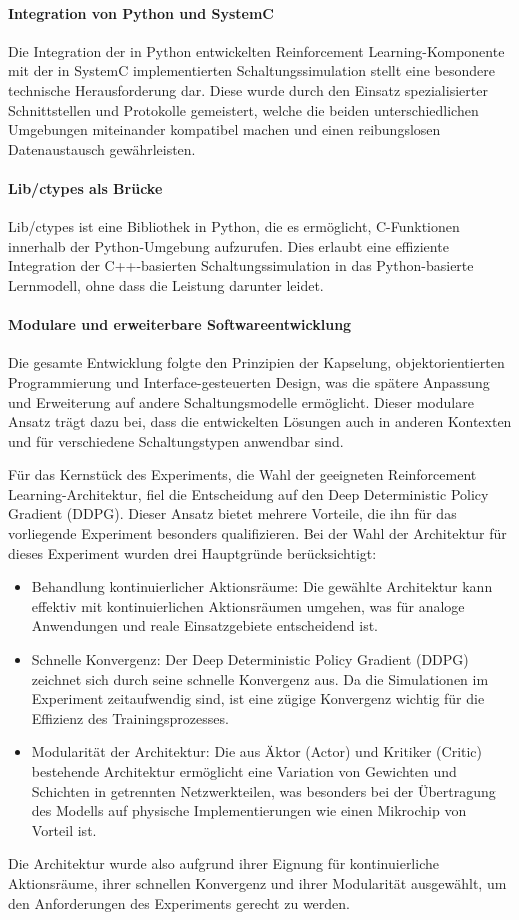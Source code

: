 \paragraph{Integration von Python und SystemC}
Die Integration der in Python entwickelten Reinforcement Learning-Komponente mit der in SystemC implementierten Schaltungssimulation stellt eine besondere technische Herausforderung dar. Diese wurde durch den Einsatz spezialisierter Schnittstellen und Protokolle gemeistert, welche die beiden unterschiedlichen Umgebungen miteinander kompatibel machen und einen reibungslosen Datenaustausch gewährleisten.

\paragraph{Lib/ctypes als Brücke}
Lib/ctypes ist eine Bibliothek in Python, die es ermöglicht, C-Funktionen innerhalb der Python-Umgebung aufzurufen. Dies erlaubt eine effiziente Integration der C++-basierten Schaltungssimulation in das Python-basierte Lernmodell, ohne dass die Leistung darunter leidet.

\paragraph{Modulare und erweiterbare Softwareentwicklung}
Die gesamte Entwicklung folgte den Prinzipien der Kapselung, objektorientierten Programmierung und Interface-gesteuerten Design, was die spätere Anpassung und Erweiterung auf andere Schaltungsmodelle ermöglicht. Dieser modulare Ansatz trägt dazu bei, dass die entwickelten Lösungen auch in anderen Kontexten und für verschiedene Schaltungstypen anwendbar sind.



Für das Kernstück des Experiments, die Wahl der geeigneten Reinforcement Learning-Architektur, fiel die Entscheidung auf den Deep Deterministic Policy Gradient (DDPG). Dieser Ansatz bietet mehrere Vorteile, die ihn für das vorliegende Experiment besonders qualifizieren. Bei der Wahl der Architektur für dieses Experiment wurden drei Hauptgründe berücksichtigt:

\begin{itemize}
    \item Behandlung kontinuierlicher Aktionsräume: Die gewählte Architektur kann effektiv mit kontinuierlichen Aktionsräumen umgehen, was für analoge Anwendungen und reale Einsatzgebiete entscheidend ist.
    \item Schnelle Konvergenz: Der Deep Deterministic Policy Gradient (DDPG) zeichnet sich durch seine schnelle Konvergenz aus. Da die Simulationen im Experiment zeitaufwendig sind, ist eine zügige Konvergenz wichtig für die Effizienz des Trainingsprozesses.
    \item Modularität der Architektur: Die aus Äktor (Actor) und Kritiker (Critic) bestehende Architektur ermöglicht eine Variation von Gewichten und Schichten in getrennten Netzwerkteilen, was besonders bei der Übertragung des Modells auf physische Implementierungen wie einen Mikrochip von Vorteil ist.
\end{itemize}

Die Architektur wurde also aufgrund ihrer Eignung für kontinuierliche Aktionsräume, ihrer schnellen Konvergenz und ihrer Modularität ausgewählt, um den Anforderungen des Experiments gerecht zu werden.

